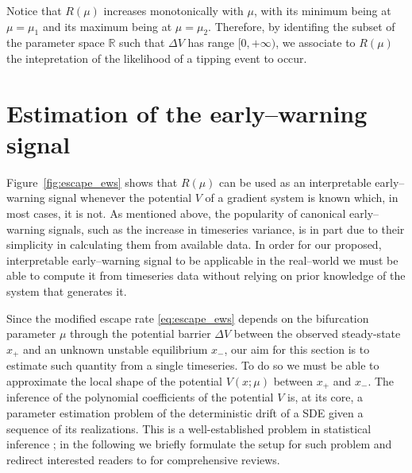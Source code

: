 Notice that $R(\mu)$ increases monotonically with $\mu$, with its minimum being at $\mu=\mu_1$ and its maximum being at $\mu=\mu_2$.
Therefore, by identifing the subset of the parameter space $\mathbb{R}$ such that $\Delta V$ has range $[0,+\infty)$, we associate to $R(\mu)$ the intepretation of the likelihood of a tipping event to occur.
%
\section{Estimation of the early--warning signal}\label{sec:estimation_ews}
Figure~\ref{fig:escape_ews} shows that $R(\mu)$ can be used as an interpretable early--warning signal whenever the potential $V$ of a gradient system is known which, in most cases, it is not.
As mentioned above, the popularity of canonical early--warning signals, such as the increase in timeseries variance, is in part due to their simplicity in calculating them from available data.
In order for our proposed, interpretable early--warning signal to be applicable in the real--world we must be able to compute it from timeseries data without relying on prior knowledge of the system that generates it.

Since the modified escape rate \eqref{eq:escape_ews} depends on the bifurcation parameter $\mu$ through the potential barrier $\Delta V$ between the observed steady-state $x_+$ and an unknown unstable equilibrium $x_-$, our aim for this section is to estimate such quantity from a single timeseries.
To do so we must be able to approximate the local shape of the potential $V(x;\mu)$ between $x_+$ and $x_-$.
The inference of the polynomial coefficients of the potential $V$ is, at its core, a parameter estimation problem of the deterministic drift of a SDE given a sequence of its realizations.
This is a well-established problem in statistical inference \cite[Ch. 11, p. 234]{Sarkka2019}; in the following we briefly formulate the setup for such problem and redirect interested readers to \cite{Nielsen2000, Sorensen2004, Craigmile2022} for comprehensive reviews.
%
